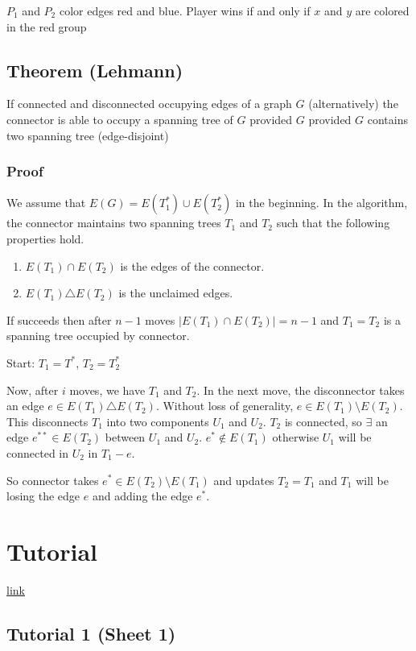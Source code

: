 \documentclass[11pt]{article}
\begin{document}
\(P_1\) and \(P_2\) color edges red and blue. Player wins if and only if \(x\) and
\(y\) are colored in the red group
\subsection{Theorem (Lehmann)}
\label{sec:org049fffa}
If connected and disconnected occupying edges of a graph \(G\) (alternatively)
the connector is able to occupy a spanning tree of \(G\) provided \(G\) provided
\(G\) contains two spanning tree (edge-disjoint)
\subsubsection{Proof}
\label{sec:orgb246b8c}
We assume that \(E(G) = E(T_1^{ * }) \cup E(T_2^{ * })\) in the beginning. In the
algorithm, the connector maintains two spanning trees \(T_1\) and \(T_2\) such
that the following properties hold.

\begin{enumerate}
\item \(E(T_1) \cap E(T_2)\) is the edges of the connector.
\item \(E(T_1) \triangle E(T_2)\) is the unclaimed edges.
\end{enumerate}

If succeeds then after \(n-1\) moves \(\vert E(T_1) \cap E(T_2) \vert = n -1\)
and \(T_1 = T_2\) is a spanning tree occupied by connector.

Start: \(T_1 = T^{ * }\), \(T_2 = T_2^{ * }\)

Now, after \(i\) moves, we have \(T_1\) and \(T_2\). In the next move, the
disconnector takes an edge \(e \in E(T_1) \triangle E(T_2)\). Without loss of
generality, \(e \in E(T_1) \setminus E(T_2)\). This disconnects \(T_1\) into two
components \(U_1\) and \(U_2\). \(T_2\) is connected, so \(\exists\) an edge \(e^{**}
    \in E(T_2)\) between \(U_1\) and \(U_2\). \(e^{ *} \notin E(T_1)\) otherwise \(U_1\)
will be connected in \(U_2\) in \(T_1 - e\).

So connector takes \(e^{*} \in E(T_2) \setminus E(T_1)\) and updates \(T_2 =
    T_1\) and \(T_1\) will be losing the edge \(e\) and adding the edge \(e^{ * }\).
\section{Tutorial}
\label{sec:orgb60789f}
\href{http://discretemath.imp.fu-berlin.de/DMII-2018-19/}{link}
\subsection{Tutorial 1 (Sheet 1)}
\label{sec:orga01e1cc}
\end{document}
